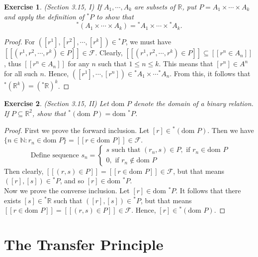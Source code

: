 \documentclass[a4paper, 11pt, openany]{book}
\theoremstyle{plain}
\newtheorem{exercise}{Exercise}[chapter]
\theoremstyle{plain}
\newcommand{\mc}{\mathcal}
\newcommand{\N}{\mathbb{N}}
\newcommand{\R}{\mathbb{R}}
\newcommand{\hyp}{{}^*}
\newcommand{\dom}{\text{dom }}
\begin{document}
  \begin{exercise}
    (Section 3.15, I)
    If $A_1,\cdots, A_k$ are subsets of $\R$, put $P=A_1\times \cdots \times A_k$ and apply the definition of $\hyp P$ to show that $$ \hyp (A_1 \times \cdots \times A_k)=\hyp A_1 \times \cdots \times \hyp A_k.$$
  \end{exercise}
  \begin{proof}
    For $([r^1], [r^2], \cdots, [r^k]) \in \hyp P$, we must have $[[(r^1, r^2, \cdots, r^k) \in P]] \in \mc{F}$. Clearly, $[[(r^1, r^2, \cdots, r^k) \in P]] \subseteq [[r^n \in A_n]]$, thus $[[r^n \in A_n]]$ for any $n$ such that $1 \leq n \leq k$. This means that $[r^n] \in A^n$ for all such $n$. Hence, $([r^1], \cdots, [r^n]) \in \hyp A_1 \times \cdots \hyp A_n$. From this, it follows that $\hyp (\R^k)=(\hyp \R)^k$.
  \end{proof}

  \begin{exercise}
    (Section 3.15, II)
    Let $\dom P$ denote the domain of a binary relation. If $P \subseteq \R^2$, show that $\hyp (\dom P)= \dom \hyp P$.
  \end{exercise}
  \begin{proof}
    First we prove the forward inclusion. Let $[r] \in \hyp (\dom P)$. Then we have $\{n \in \N: r_n \in \dom P\}=[[r \in \dom P]] \in \mc{F}$. $$\text{ Define sequence } s_n = \begin{cases} s \text{ such that } (r_n, s) \in P, \text{ if } r_n \in \dom P \\ 0, \text{ if } r_n \notin \dom P \end{cases}$$ Then clearly, $[[(r,s) \in P]]=[[r \in \dom P]] \in \mc{F}$, but that means $([r], [s]) \in \hyp P$, and so $[r] \in \dom \hyp P$. \\
    Now we prove the converse inclusion. Let $[r] \in \dom \hyp P$. It follows that there exists $[s] \in \hyp \R$ such that $([r], [s]) \in \hyp P$, but that means $[[r \in \dom P]]=[[(r,s) \in P]] \in \mc{F}$. Hence, $[r] \in \hyp (\dom P)$.
  \end{proof}

\chapter{The Transfer Principle}
\end{document}
